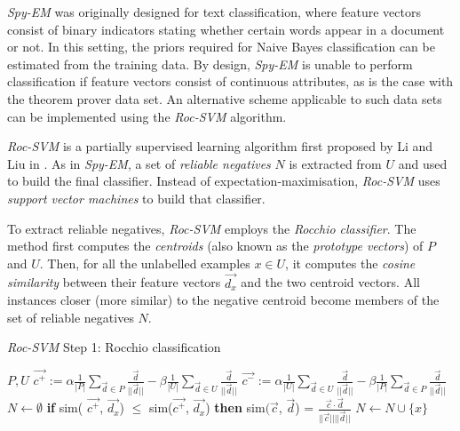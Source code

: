 \documentclass[12pt,twoside,notitlepage,amsart]{report} %
\begin{document}
	\emph{Spy-EM} was originally designed for text classification, where feature vectors consist of binary indicators stating whether certain words appear in a document or not. In this setting, the priors required for Naive Bayes classification can be estimated from the training data. By design, \emph{Spy-EM} is unable to perform classification if feature vectors consist of continuous attributes, as is the case with the theorem prover data set. An alternative scheme applicable to such data sets can be implemented using the \emph{Roc-SVM} algorithm.
	
	\emph{Roc-SVM} is a partially supervised learning algorithm first proposed by Li and Liu in \cite{Li03}. As in \emph{Spy-EM}, a set of \emph{reliable negatives} $N$ is extracted from $U$ and used to build the final classifier. Instead of expectation-maximisation, \emph{Roc-SVM} uses \emph{support vector machines} to build that classifier.
	 
	To extract reliable negatives, \emph{Roc-SVM} employs the \emph{Rocchio classifier}. The method first computes the \emph{centroids} (also known as the \emph{prototype vectors}) of $P$ and $U$. Then, for all the unlabelled examples $x \in U$, it computes the \emph{cosine similarity} between their feature vectors $\vec{d_x}$ and the two centroid vectors. All instances closer (more similar) to the negative centroid become members of the set of reliable negatives $N$. 
	
	\renewcommand{\thealgorithm}{2.1}
	\begin{algorithm}
	  \caption{\emph{Roc-SVM} Step 1: Rocchio classification
	    \label{alg:rocsvm1}}
	  \begin{algorithmic}[1]
	    \Statex
	     {$P, U$}
	    \Statex
	      \State $ \displaystyle \vec{c^{+}} := \alpha \frac{1}{|P|} \sum_{\vec{d} \in P}{ \frac{\vec{d}}{||\vec{d}||}} - \beta \frac{1}{|U|} \sum_{\vec{d} \in U}{ \frac{\vec{d}}{||\vec{d}||}}$
		   	\Statex
	     \State $\displaystyle \vec{c^{-}} := \alpha \frac{1}{|U|} \sum_{\vec{d} \in U}{ \frac{\vec{d}}{||\vec{d}||}} - \beta \frac{1}{|P|} \sum_{\vec{d} \in P}{ \frac{\vec{d}}{||\vec{d}||} }$ 
				\Statex
					\State 	$N \gets \emptyset$
	      	\State \textbf{if}  sim( $\vec{c^{+}}$, $\vec{d_x}$) $ \leq $ sim($\vec{c^{+}}$, $\vec{d_x}$) \textbf{then} \Comment sim$(\vec{c}$, $\vec{d}$) = $ \frac{\vec{c} \cdot \vec{d}}{||\vec{c}|| ||\vec{d}||} $
	      	\State $N \gets N \cup \{ x \} $
	      	\EndFor
	
	      
				\Statex
	      
	  \end{algorithmic}
	\end{algorithm}
	
\end{document}
